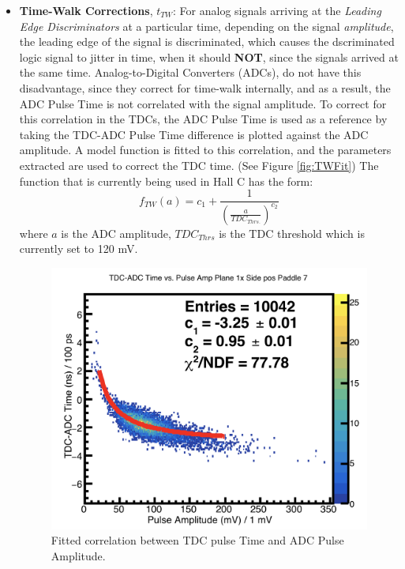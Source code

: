 \documentclass[14pt]{article}
\begin{document}
\begin{itemize}
\item \textbf{Time-Walk Corrections}, $t_{TW}$: For analog signals arriving at the \textit{Leading Edge Discriminators}
  at a particular time, depending on the signal \textit{amplitude}, the leading edge of the signal is discriminated,
  which causes the dscriminated logic signal to jitter in time, when it should \textbf{NOT}, since the signals arrived at the
  same time. Analog-to-Digital Converters (ADCs), do not have this disadvantage, since they correct for time-walk internally,
  and as a result, the ADC Pulse Time is not correlated with the signal amplitude. To correct for this correlation in the TDCs,
  the ADC Pulse Time is used as a reference by taking the TDC-ADC Pulse Time difference is plotted against the ADC amplitude. A model
  function is fitted to this correlation, and the parameters extracted are used to correct the TDC time. (See Figure \ref{fig:TWFit}) The function that is currently
  being used in Hall C has the form:
  \begin{equation}
    f_{TW}(a) = c_{1} + \frac{1}{(\frac{a}{TDC_{Thrs.}})^{c_{2}}}
  \end{equation}
  where $a$ is the ADC amplitude,  $TDC_{Thrs}$ is the TDC threshold which is currently set to 120 mV. \newpage
\begin{figure}[H]
  \captionsetup{justification=raggedright,singlelinecheck=false}
    \includegraphics[scale=0.35]{1x7-_TWFit.png}
    \caption{Fitted correlation between TDC pulse Time and ADC Pulse Amplitude.}

\end{figure}
\end{itemize}
\end{document}
